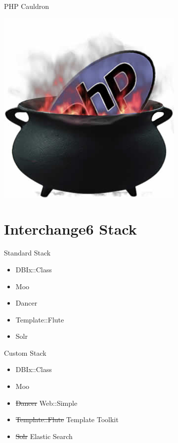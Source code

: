 \begin{frame}{PHP Cauldron}
  \begin{center}
    \includegraphics[width=\textwidth,height=0.8\textheight,keepaspectratio]{images/cauldron.jpg}
  \end{center}
\end{frame}

\section{Interchange6 Stack}
\begin{frame}{Standard Stack}
  \begin{itemize}
  \item DBIx::Class
  \item Moo
  \item Dancer
  \item Template::Flute
  \item Solr
  \end{itemize}
\end{frame}

\begin{frame}{Custom Stack}
  \begin{itemize}
  \item DBIx::Class
  \item Moo
  \item \sout{Dancer} Web::Simple
  \item \sout{Template::Flute} Template Toolkit
  \item \sout{Solr} Elastic Search
  \end{itemize}
\end{frame}

